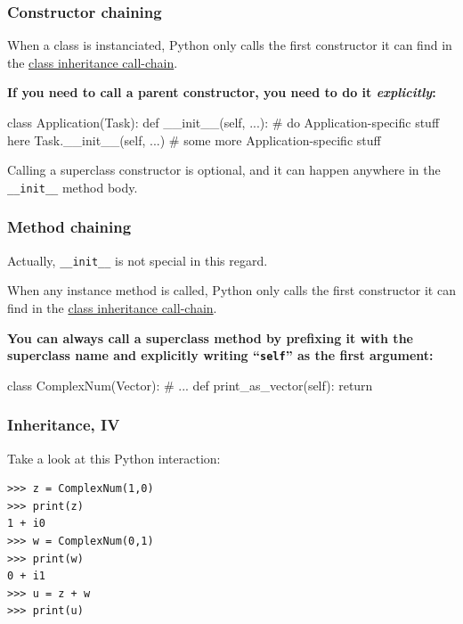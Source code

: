 \documentclass[english,serif,mathserif,xcolor=pdftex,dvipsnames,table]{beamer}
\begin{document}
\begin{frame}[fragile]
  \frametitle{Constructor chaining}

    When a class is instanciated, Python only calls the first
    constructor it can find in the
    \href{http://www.python.org/download/releases/2.3/mro/}{class inheritance call-chain}.

    \+ \textbf{If you need to call a parent constructor, you need
      to do it \emph{explicitly}:}
    \begin{python}
class Application(Task):
  def __init__(self, ...):
    # do Application-specific stuff here
    Task.__init__(self, ...)
    # some more Application-specific stuff
    \end{python}

    \+
    Calling a superclass constructor is optional, and
    it can happen anywhere in the \lstinline|__init__| method body.
\end{frame}


\begin{frame}[fragile]
  \frametitle{Method chaining}

  Actually, \lstinline|__init__| is not special in this regard.

  \+ When any instance method is called, Python only calls the first
  constructor it can find in the
  \href{http://www.python.org/download/releases/2.3/mro/}{class
    inheritance call-chain}.

  \+ \textbf{You can always call a superclass method by prefixing it
    with the superclass name and explicitly writing ``\texttt{self}''
    as the first argument:}
    \begin{python}
class ComplexNum(Vector):
  # ...
  def print_as_vector(self):
    return ~~
    \end{python}
\end{frame}


\begin{frame}[fragile]
  \frametitle{Inheritance, IV}
Take a look at this Python interaction:
\begin{lstlisting}
>>> z = ComplexNum(1,0)
>>> print(z)
1 + i0
>>> w = ComplexNum(0,1)
>>> print(w)
0 + i1
>>> u = z + w
>>> print(u)
\end{lstlisting}
%
\end{frame}
\end{document}
